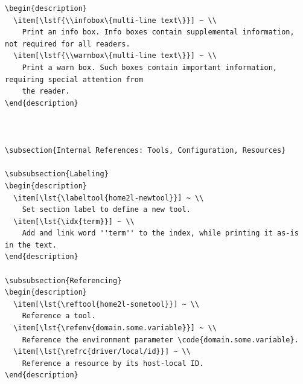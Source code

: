 \documentclass[12pt,english,parskip=half,headheight=19pt]{scrreprt}
\makeatletter
\newcommand{\lst}[1]{\colorbox{lstbackground}{\footnotesize\code{#1}}}
\newcommand{\lstf}[1]{\colorbox{lstbackground}{\ttfamily\footnotesize#1}}
\newcommand{\infobox}[1]{
  \par
  \medskip
  \hfill
  \setlength\arrayrulewidth{1pt}
  \begin{tabular}[t]{c|c|}
    \parbox{1.8em}{\hfill\textit{\Huge\textbf{i}\,}}
    &
    \,\parbox{0.89\linewidth}{\setlength{\parskip}{0.5em} \small #1}\,
  \end{tabular}
  \medskip
  \par
}
\newcommand{\warnbox}[1]{
  \par
  \medskip
  \hfill
  \setlength\arrayrulewidth{1pt}
  \begin{tabular}[b]{c|c|}
    
    &
    \,\parbox{0.89\linewidth}{\setlength{\parskip}{0.5em}#1}\,
  \end{tabular}
  \medskip
  \par
}
\newcommand{\labeltool}[1]{\index{#1@\texttt{#1} (tool)} \label{tool:#1}}
\newcommand{\idx}[1]{#1\index{#1}}
\newcommand{\refenv}[1]{\hyperref[env:#1]{\texttt{#1}}}        %
\newcommand{\refrc}[1]{\hyperref[rc:#1]{\texttt{#1}}}
\newcommand{\reftool}[1]{\hyperref[tool:#1]{\texttt{\idx{#1}}}}
\makeatother
\begin{document}
\begin{description}
{\begin{lstlisting}[language=<language>]
\begin{description}
  \item[\lstf{\\infobox\{multi-line text\}}] ~ \\
    Print an info box. Info boxes contain supplemental information, not required for all readers.
  \item[\lstf{\\warnbox\{multi-line text\}}] ~ \\
    Print a warn box. Such boxes contain important information, requiring special attention from
    the reader.
\end{description}



\subsection{Internal References: Tools, Configuration, Resources}

\subsubsection{Labeling}
\begin{description}
  \item[\lst{\labeltool{home2l-newtool}}] ~ \\
    Set section label to define a new tool.
  \item[\lst{\idx{term}}] ~ \\
    Add and link word ''term'' to the index, while printing it as-is in the text.
\end{description}

\subsubsection{Referencing}
\begin{description}
  \item[\lst{\reftool{home2l-sometool}}] ~ \\
    Reference a tool.
  \item[\lst{\refenv{domain.some.variable}}] ~ \\
    Reference the environment parameter \code{domain.some.variable}.
  \item[\lst{\refrc{driver/local/id}}] ~ \\
    Reference a resource by its host-local ID.
\end{description}




\end{lstlisting}}
\end{description}
\end{document}
